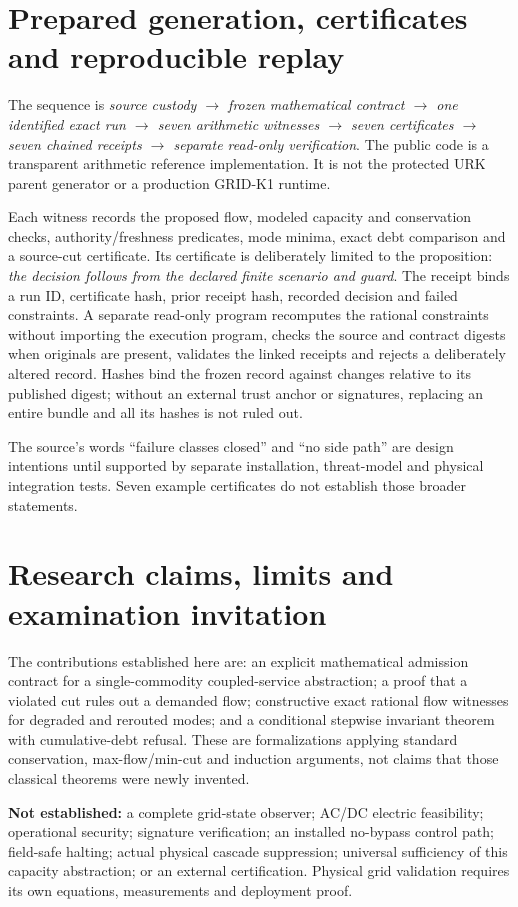 \documentclass[11pt,letterpaper]{article}
\theoremstyle{definition}\newtheorem{definition}[theorem]{Definition}\newtheorem{example}[theorem]{Example}
\theoremstyle{remark}\newtheorem{remark}[theorem]{Remark}
\begin{document}
\section{Prepared generation, certificates and reproducible replay}
The sequence is \emph{source custody $\to$ frozen mathematical contract $\to$ one identified exact run $\to$ seven arithmetic witnesses $\to$ seven certificates $\to$ seven chained receipts $\to$ separate read-only verification}. The public code is a transparent arithmetic reference implementation. It is not the protected URK parent generator or a production GRID-K1 runtime.

Each witness records the proposed flow, modeled capacity and conservation checks, authority/freshness predicates, mode minima, exact debt comparison and a source-cut certificate. Its certificate is deliberately limited to the proposition: \emph{the decision follows from the declared finite scenario and guard}. The receipt binds a run ID, certificate hash, prior receipt hash, recorded decision and failed constraints. A separate read-only program recomputes the rational constraints without importing the execution program, checks the source and contract digests when originals are present, validates the linked receipts and rejects a deliberately altered record. Hashes bind the frozen record against changes relative to its published digest; without an external trust anchor or signatures, replacing an entire bundle and all its hashes is not ruled out.

The source's words ``failure classes closed'' and ``no side path'' are design intentions until supported by separate installation, threat-model and physical integration tests. Seven example certificates do not establish those broader statements.

\section{Research claims, limits and examination invitation}
The contributions established here are: an explicit mathematical admission contract for a single-commodity coupled-service abstraction; a proof that a violated cut rules out a demanded flow; constructive exact rational flow witnesses for degraded and rerouted modes; and a conditional stepwise invariant theorem with cumulative-debt refusal. These are formalizations applying standard conservation, max-flow/min-cut and induction arguments, not claims that those classical theorems were newly invented.

\textbf{Not established:} a complete grid-state observer; AC/DC electric feasibility; operational security; signature verification; an installed no-bypass control path; field-safe halting; actual physical cascade suppression; universal sufficiency of this capacity abstraction; or an external certification. Physical grid validation requires its own equations, measurements and deployment proof.
\end{document}
